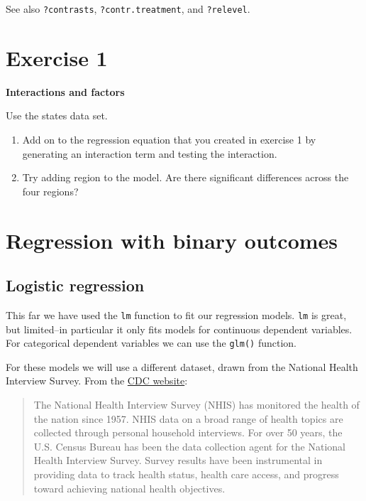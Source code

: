 \documentclass[]{book}
\begin{document}
See also \texttt{?contrasts}, \texttt{?contr.treatment}, and
\texttt{?relevel}.

\section{Exercise 1}\label{exercise-1-1}

\textbf{Interactions and factors}

Use the states data set.

\begin{enumerate}
\def\labelenumi{\arabic{enumi}.}
\item
  Add on to the regression equation that you created in exercise 1 by
  generating an interaction term and testing the interaction.
\item
  Try adding region to the model. Are there significant differences
  across the four regions?
\end{enumerate}

\section{Regression with binary
outcomes}\label{regression-with-binary-outcomes}

\subsection{Logistic regression}\label{logistic-regression}

This far we have used the \texttt{lm} function to fit our regression
models. \texttt{lm} is great, but limited--in particular it only fits
models for continuous dependent variables. For categorical dependent
variables we can use the \texttt{glm()} function.

For these models we will use a different dataset, drawn from the
National Health Interview Survey. From the
\href{http://www.cdc.gov/nchs/nhis.htm}{CDC website}:

\begin{quote}
The National Health Interview Survey (NHIS) has monitored the health of
the nation since 1957. NHIS data on a broad range of health topics are
collected through personal household interviews. For over 50 years, the
U.S. Census Bureau has been the data collection agent for the National
Health Interview Survey. Survey results have been instrumental in
providing data to track health status, health care access, and progress
toward achieving national health objectives.
\end{quote}
\end{document}
